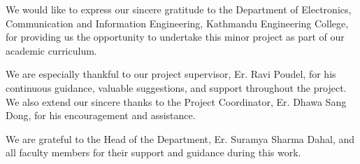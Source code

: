 We would like to express our sincere gratitude to the Department of Electronics, Communication and Information Engineering, Kathmandu Engineering College, for providing us the opportunity to undertake this minor project as part of our academic curriculum.

We are especially thankful to our project supervisor, Er. Ravi Poudel, for his continuous guidance, valuable suggestions, and support throughout the project. We also extend our sincere thanks to the Project Coordinator, Er. Dhawa Sang Dong, for his encouragement and assistance.

We are grateful to the Head of the Department, Er. Suramya Sharma Dahal, and all faculty members for their support and guidance during this work.